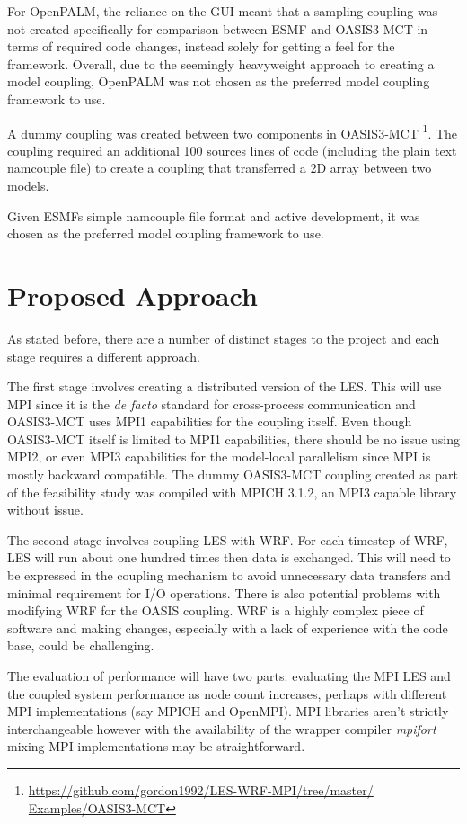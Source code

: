 \documentclass{acm_proc_article-sp}
\renewcommand{\_}{\underscore\hspace{0pt}}
\begin{document}
For OpenPALM, the reliance on the GUI meant that a sampling coupling was not
created specifically for comparison between ESMF and OASIS3-MCT in terms of
required code changes, instead solely for getting a feel for the framework.
Overall, due to the seemingly heavyweight approach to creating a model coupling,
OpenPALM was not chosen as the preferred model coupling framework to use.

A dummy coupling was created between two components in OASIS3-MCT
\footnote{\url{https://github.com/gordon1992/LES-WRF-MPI/tree/master/
Examples/OASIS3-MCT}}. The coupling required an additional 100 sources lines of
code (including the plain text namcouple file) to create a coupling that
transferred a 2D array between two models.

Given ESMFs simple namcouple file format and active development, it was chosen
as the preferred model coupling framework to use.

\section*{Proposed Approach}

As stated before, there are a number of distinct stages to the project and each
stage requires a different approach.

The first stage involves creating a distributed version of the LES. This will
use MPI since it is the \textit{de facto} standard for cross-process
communication and OASIS3-MCT uses MPI1 capabilities for the coupling itself.
Even though OASIS3-MCT itself is limited to MPI1 capabilities, there should be
no issue using MPI2, or even MPI3 capabilities for the model-local parallelism
since MPI is mostly backward compatible. The dummy OASIS3-MCT coupling created
as part of the feasibility study was compiled with MPICH 3.1.2, an MPI3 capable
library without issue.

The second stage involves coupling LES with WRF. For each timestep of WRF, LES
will run about one hundred times then data is exchanged. This will need to be
expressed in the coupling mechanism to avoid unnecessary data transfers and
minimal requirement for I/O operations. There is also potential problems with
modifying WRF for the OASIS coupling. WRF is a highly complex piece of software
and making changes, especially with a lack of experience with the code base,
could be challenging.

The evaluation of performance will have two parts: evaluating the MPI LES and
the coupled system performance as node count increases, perhaps with different
MPI implementations (say MPICH and OpenMPI). MPI libraries aren't strictly
interchangeable however with the availability of the wrapper compiler
\textit{mpifort} mixing MPI implementations may be straightforward.
\end{document}
